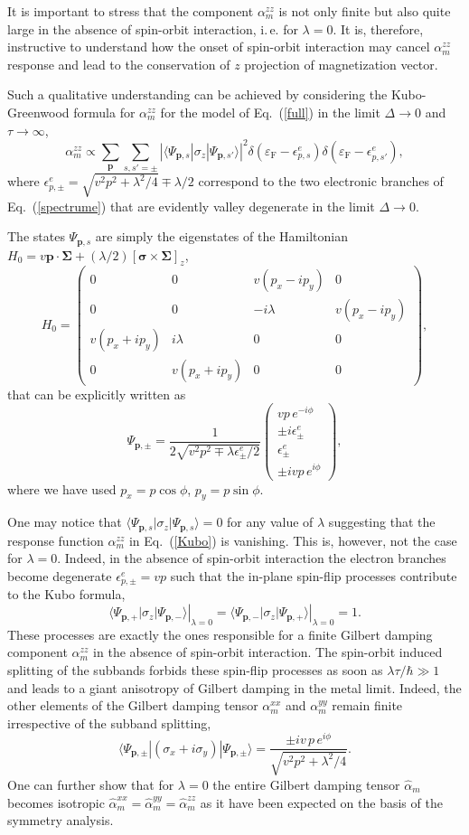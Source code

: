 \documentclass[%
  twocolumn,
  aps,
  prb,
  amsmath,
  amssymb,
  superscriptaddress,
  nofootinbib,
  floatfix
]{revtex4-1}
\newcommand{\s}{\sum\limits}
\newcommand{\be}{\begin{equation}}
\newcommand{\e}{\end{equation}}
\newcommand{\bpm}{\begin{pmatrix}}
\newcommand{\epm}{\end{pmatrix}}
\newcommand{\lt}{\left}
\newcommand{\rt}{\right}
\newcommand{\la}{\langle}
\newcommand{\ra}{\rangle}
\newcommand{\ep}{\varepsilon}
\newcommand{\bb}{\boldsymbol}
\newcommand{\0}{^{\phantom{\dagger}}}
\begin{document}
It is important to stress that the component $\alpha^{zz}_m$ is not only finite but also quite large in the absence of spin-orbit interaction, i.\,e. for $\lambda=0$. It is, therefore, instructive to understand how the onset of spin-orbit interaction may cancel $\alpha^{zz}_m$ response and lead to the conservation of $z$ projection of magnetization vector.  

Such a qualitative understanding can be achieved by considering the Kubo-Greenwood formula for $\alpha^{zz}_m$ for the model 
of Eq.~(\ref{full}) in the limit $\Delta\to 0$ and $\tau\to \infty$, 
\be
\label{Kubo}
\alpha^{zz}_m \propto \s_{\bb{p}}\!\!\s_{s,s'=\pm} \!|\la \Psi_{\bb{p},s}| \sigma_z |\Psi_{\bb{p},s'}\ra |^2
\delta(\ep_\textrm{F}-\epsilon^{e}_{p,s})\delta(\ep_\textrm{F}-\epsilon^{e}_{p,s'}),
\e
where $\epsilon^e_{p,\pm}=\sqrt{v^2p^2+\lambda^2/4}\mp\lambda/2$ correspond to the two electronic branches of Eq.~(\ref{spectrume}) that are evidently valley degenerate in the limit $\Delta\to 0$. 

The states $\Psi_{\bb{p},s}$ are simply the eigenstates of the Hamiltonian $H_0 = v\bb{p}\cdot\bb{\Sigma}+(\lambda/2) \lt[\bb{\sigma}\times\bb{\Sigma}\rt]_z$,
\be
H_0 =
\bpm
0 & 0 & v(p_x \!-\!i p_y) & 0\\
0 & 0 & -i \lambda & v(p_x\!-\!i p_y) \\
v(p_x\!+\!i p_y) & i\lambda & 0 & 0\\
0 & v(p_x\!+\!i p_y) & 0 & 0
\epm,
\e
that can be explicitly written as
\be
\Psi_{\bb{p},\pm}=
\frac{1}{2\sqrt{v^2p^2\mp\lambda \epsilon^e_\pm/2}} \bpm vp\, e^{-i \phi}\\ \pm i \epsilon^e_\pm\\ \epsilon^e_\pm\\ \pm i v p\, e^{i \phi}\epm,
\e
where we have used $p_x=p\cos\phi$, $p_y=p\sin\phi$. 

One may notice that $\la \Psi_{\bb{p},s}| \sigma_z |\Psi_{\bb{p},s}\ra =0$ for any value of $\lambda$ suggesting that the response function $\alpha^{zz}_m$ in Eq.~(\ref{Kubo}) is vanishing. This is, however, not the case for $\lambda=0$. Indeed, in the absence of spin-orbit interaction the electron branches become degenerate $\epsilon^e_{p,\pm}=v p$ such that the in-plane spin-flip processes contribute to the Kubo formula,
\be
\lt.\la \Psi_{\bb{p},+}| \sigma_z |\Psi_{\bb{p},-}\ra\rt|_{\lambda=0}=\lt.\la \Psi_{\bb{p},-}| \sigma_z |\Psi_{\bb{p},+}\ra\rt|_{\lambda=0}=1.
\e
These processes are exactly the ones responsible for a finite Gilbert damping component $\alpha^{zz}_m$ in the absence of spin-orbit interaction. The spin-orbit induced splitting of the subbands  forbids these spin-flip processes as soon as $\lambda\tau/\hbar \gg 1$  and leads to a giant anisotropy of Gilbert damping in the metal limit. Indeed, the other elements of the Gilbert damping tensor $\alpha^{xx}_m$ and  $\alpha^{yy}_m$ remain finite irrespective of the subband splitting,
\be
\la \Psi_{\bb{p},\pm}| (\sigma_x+i\sigma_y) |\Psi_{\bb{p},\pm}\ra=\frac{\pm i v\,p\,e^{i\phi}}{\sqrt{v^2p^2+\lambda^2/4}}.
\e
One can further show that for $\lambda=0$ the entire Gilbert damping tensor $\hat{\alpha}_m$ becomes isotropic $\hat{\alpha}^{xx}_m=\hat{\alpha}^{yy}_m=\hat{\alpha}^{zz}_m$ as it have been expected on the basis of the symmetry analysis. 
\end{document}
